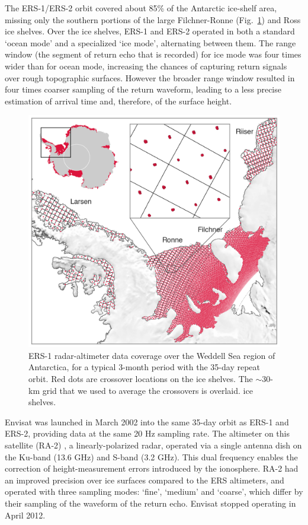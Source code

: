 The ERS-1/ERS-2 orbit covered about 85\% of the Antarctic ice-shelf area, missing only the southern portions of the large Filchner-Ronne (Fig.~\ref{c2f1}) and Ross ice shelves. Over the ice shelves, ERS-1 and ERS-2 operated in both a standard `ocean mode' and a specialized `ice mode', alternating between them. The range window (the segment of return echo that is recorded) for ice mode was four times wider than for ocean mode, increasing the chances of capturing return signals over rough topographic surfaces. However the broader range window resulted in four times coarser sampling of the return waveform, leading to a less precise estimation of arrival time and, therefore, of the surface height.


\begin{figure}[!ht]
  \centering
  \includegraphics[width=.78\textwidth]{img/map_xovers_grid_v8.png}
  \caption[Altimeter data coverage over the ice shelves]{ERS-1 radar-altimeter data coverage over the Weddell Sea region of Antarctica, for a typical 3-month period with the 35-day repeat orbit. Red dots are crossover locations on the ice shelves. The $\sim$30-km grid that we used to average the crossovers is overlaid. 
  ice shelves.} 
  \label{c2f1}
\end{figure}


Envisat was launched in March 2002 into the same 35-day orbit as ERS-1 and ERS-2, providing data at the same 20 Hz sampling rate. The altimeter on this satellite (RA-2) \parencite{Roca2009}, a linearly-polarized radar, operated via a single antenna dish on the Ku-band (13.6 GHz) and S-band (3.2 GHz). This dual frequency enables the correction of height-measurement errors introduced by the ionosphere. RA-2 had an improved precision over ice surfaces compared to the ERS altimeters, and operated with three sampling modes: `fine', `medium' and `coarse', which differ by their sampling of the waveform of the return echo. Envisat stopped operating in April 2012.

